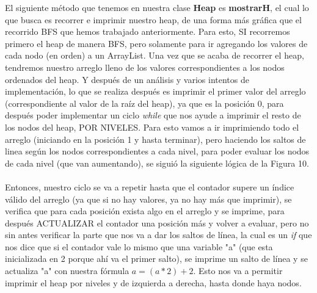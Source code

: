 \documentclass{report}
\begin{document}
El siguiente método que tenemos en nuestra clase \textbf{Heap} es \textbf{mostrarH}, el cual lo que busca es recorrer e imprimir nuestro heap, de una forma más gráfica que el recorrido BFS que hemos trabajado anteriormente. Para esto, SI recorremos primero el heap de manera BFS, pero solamente para ir agregando los valores de cada nodo (en orden) a un ArrayList. Una vez que se acaba de recorrer el heap, tendremos nuestro arreglo lleno de los valores correspondientes a los nodos ordenados del heap. Y después de un análisis y varios intentos de implementación, lo que se realiza después es imprimir el primer valor del arreglo (correspondiente al valor de la raíz del heap), ya que es la posición 0, para después poder implementar un ciclo \textit{while} que nos ayude a imprimir el resto de los nodos del heap, POR NIVELES. Para esto vamos a ir imprimiendo todo el arreglo (iniciando en la posición 1 y hasta terminar), pero haciendo los saltos de linea según los nodos correspondientes a cada nivel, para poder evaluar los nodos de cada nivel (que van aumentando), se siguió la siguiente lógica de la Figura 10.\\\\

Entonces, nuestro ciclo se va a repetir hasta que el contador supere un índice válido del arreglo (ya que si no hay valores, ya no hay más que imprimir), se verifica que para cada posición exista algo en el arreglo y se imprime, para después ACTUALIZAR el contador una posición más y volver a evaluar, pero no sin antes verificar la parte que nos va a dar los saltos de línea, la cual es un \textit{if} que nos dice que si el contador vale lo mismo que una variable "a" (que esta inicializada en 2 porque ahí va el primer salto), se imprime un salto de línea y se actualiza "a" con nuestra fórmula $a=(a*2)+2$. Esto nos va a permitir imprimir el heap por niveles y de izquierda a derecha, hasta donde haya nodos.
\end{document}
